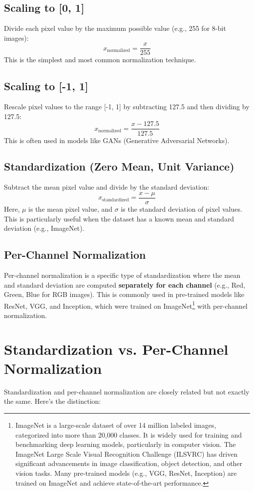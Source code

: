 \begin{notechapter}
\subsection{Scaling to [0, 1]}
Divide each pixel value by the maximum possible value (e.g., 255 for
8-bit images):
\[
x_{\text{normalized}} = \frac{x}{255}
\]
This is the simplest and most common normalization technique.

\subsection{Scaling to [-1, 1]}
Rescale pixel values to the range [-1, 1] by subtracting 127.5 and
then dividing by 127.5:
\[
x_{\text{normalized}} = \frac{x - 127.5}{127.5}
\]
This is often used in models like GANs (Generative Adversarial
Networks).

\subsection{Standardization (Zero Mean, Unit Variance)}
Subtract the mean pixel value and divide by the standard deviation:
\[
x_{\text{standardized}} = \frac{x - \mu}{\sigma}
\]
Here, \(\mu\) is the mean pixel value, and \(\sigma\) is the
standard deviation of pixel values. This is particularly useful
when the dataset has a known mean and standard deviation (e.g.,
ImageNet).

\subsection{Per-Channel Normalization}
Per-channel normalization is a specific type of standardization
where the mean and standard deviation are computed \textbf{separately
for each channel} (e.g., Red, Green, Blue for RGB images). This is
commonly used in pre-trained models like ResNet, VGG, and Inception,
which were trained on ImageNet\footnote{ImageNet is a large-scale
dataset of over 14 million labeled images, categorized into more
than 20,000 classes. It is widely used for training and benchmarking
deep learning models, particularly in computer vision. The ImageNet
Large Scale Visual Recognition Challenge (ILSVRC) has driven
significant advancements in image classification, object detection,
and other vision tasks. Many pre-trained models (e.g., VGG, ResNet,
Inception) are trained on ImageNet and achieve state-of-the-art
performance.} with per-channel normalization.

\section{Standardization vs. Per-Channel Normalization}
Standardization and per-channel normalization are closely related but
not exactly the same. Here’s the distinction:


\end{notechapter}
